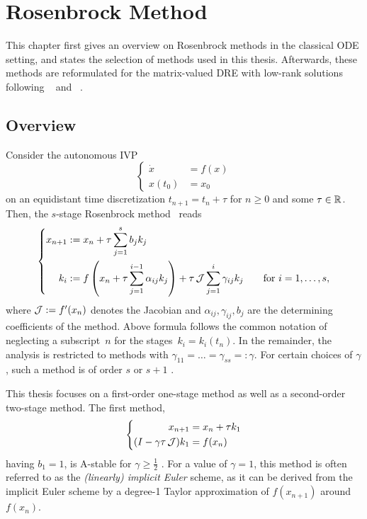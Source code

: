 \chapter{Rosenbrock Method}
\label{sec:ros}

This chapter first gives an overview on Rosenbrock methods in the classical \ac{ODE} setting,
and states the selection of methods used in this thesis.
Afterwards, these methods are reformulated for the matrix-valued \ac{DRE} with low-rank solutions
following \citeauthor{Lang2017}~\cite{Lang2017}
and \citeauthor{Mena2007}~\cite{Mena2007}.

\section{Overview}

Consider the autonomous \ac{IVP}
\begin{equation}
\left\{
\begin{aligned}
  \dot x &= f(x) \\
  x(t_0) &= x_0
\end{aligned}
\right.
\end{equation}
on an equidistant time discretization $t_{n+1} = t_n + \tau$ for $n\geq 0$ and some $\tau\in\mathbb{R}$.
Then, the $s$-stage Rosenbrock method~ reads
\begin{equation}
\label{eq:ros:def}
\left\{
\begin{aligned}
  x_{n+1} &:= x_n + \tau \sum_{j=1}^s b_j k_j
  \\
  k_i &:= f\left( x_n + \tau \sum_{j=1}^{i-1} \alpha_{ij} k_j \right) + \tau \operatorname{\mathcal J} \sum_{j=1}^i \gamma_{ij} k_j
  \qquad
  \text{for } i = 1, \ldots, s
  ,
\end{aligned}
\right.
\end{equation}
where $\operatorname{\mathcal J} := f'(x_n)$ denotes the Jacobian and $\alpha_{ij}, \gamma_{ij}, b_j$ are the determining coefficients of the method.
Above formula follows the common notation of neglecting a subscript~$n$ for the stages~$k_i=k_i(t_n)$.
In the remainder, the analysis is restricted to methods with $\gamma_{11} = \ldots = \gamma_{ss} =: \gamma$.
For certain choices of $\gamma$, such a method is of order $s$ or $s+1$ \cite{HairerWanner2}.

This thesis focuses on a first-order one-stage method as well as a second-order two-stage method.
The first method, 
\begin{equation}
\label{eq:ros:gen:ros1}
\left\{
\begin{aligned}
  x_{n+1} &= x_n + \tau k_1 \\
  (I - \gamma\tau \operatorname{\mathcal J}) k_1 &= f(x_n)
\end{aligned}
\right.
\end{equation}
having $b_1=1$,
is A-stable for $\gamma \geq \frac{1}{2}$ \cite[Table~6.3]{HairerWanner2}.
For a value of $\gamma=1$, this method
is often referred to as the \emph{(linearly) implicit Euler} scheme,
as it can be derived from the implicit Euler scheme
by a degree-1 Taylor approximation of $f(x_{n+1})$ around $f(x_n)$.

